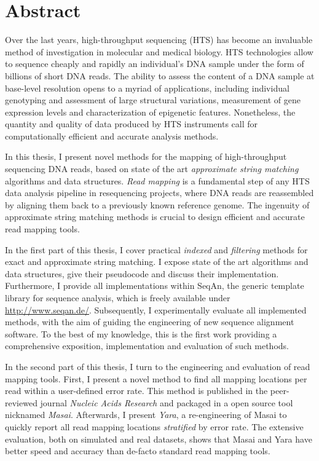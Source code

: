 \section*{Abstract}
\label{sec:abstract:en}

Over the last years, high-throughput sequencing (HTS) has become an invaluable method of investigation in molecular  and medical biology.
HTS technologies allow to sequence cheaply and rapidly an individual's DNA sample under the form of billions of short DNA reads.
The ability to assess the content of a DNA sample at base-level resolution opens to a myriad of applications, including individual genotyping and assessment of large structural variations, measurement of gene expression levels and characterization of epigenetic features.
Nonetheless, the quantity and quality of data produced by HTS instruments call for computationally efficient and accurate analysis methods.

In this thesis, I present novel methods for the mapping of high-throughput sequencing DNA reads, based on state of the art \emph{approximate string matching} algorithms and data structures.
\emph{Read mapping} is a fundamental step of any HTS data analysis pipeline in resequencing projects, where DNA reads are reassembled by aligning them back to a previously known reference genome.
The ingenuity of approximate string matching methods is crucial to design efficient and accurate read mapping tools.

In the first part of this thesis, I cover practical \emph{indexed} and \emph{filtering} methods for exact and approximate string matching.
I expose state of the art algorithms and data structures, give their pseudocode and discuss their implementation.
Furthermore, I provide all implementations within SeqAn, the generic \CC template library for sequence analysis, which is freely available under \url{http://www.seqan.de/}.
Subsequently, I experimentally evaluate all implemented methods, with the aim of guiding the engineering of new sequence alignment software.
To the best of my knowledge, this is the first work providing a comprehensive exposition, implementation and evaluation of such methods.

In the second part of this thesis, I turn to the engineering and evaluation of read mapping tools.
First, I present a novel method to find all mapping locations per read within a user-defined error rate.
This method is published in the peer-reviewed journal \emph{Nucleic Acids Research} and packaged in a open source tool nicknamed \emph{Masai}.
Afterwards, I present \emph{Yara}, a re-engineering of Masai to quickly report all read mapping locations \emph{stratified} by error rate.
The extensive evaluation, both on simulated and real datasets, shows that Masai and Yara have better speed and accuracy than de-facto standard read mapping tools.


\newpage
